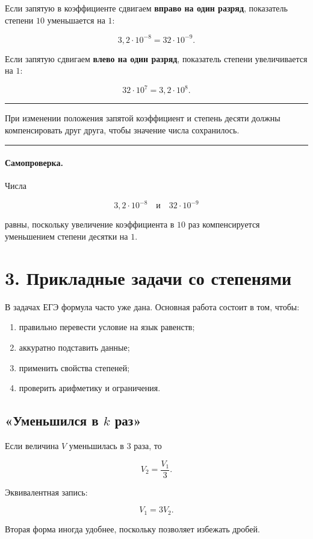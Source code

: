 \documentclass[a4paper,12pt]{article}
\newcommand{\important}[1]{\textbf{\color{darkaccent}#1}}
\newcommand{\keyidea}[1]{%
    \par\medskip
    {\color{accent}\rule{\linewidth}{0.6pt}}\par
    \smallskip
    #1
    \smallskip
    {\color{accent}\rule{\linewidth}{0.6pt}}\par
    \medskip
}
\begin{document}
Если запятую в коэффициенте сдвигаем \important{вправо на один разряд}, показатель степени \(10\) уменьшается на \(1\):

\[
3{,}2\cdot10^{-8}
=
32\cdot10^{-9}.
\]

Если запятую сдвигаем \important{влево на один разряд}, показатель степени увеличивается на \(1\):

\[
32\cdot10^7
=
3{,}2\cdot10^8.
\]

\keyidea{
При изменении положения запятой коэффициент и степень десяти должны компенсировать друг друга, чтобы значение числа сохранилось.
}

\paragraph{Самопроверка.}
Числа

\[
3{,}2\cdot10^{-8}
\quad\text{и}\quad
32\cdot10^{-9}
\]

равны, поскольку увеличение коэффициента в \(10\) раз компенсируется уменьшением степени десятки на \(1\).

\section{3. Прикладные задачи со степенями}

В задачах ЕГЭ формула часто уже дана. Основная работа состоит в том, чтобы:

\begin{enumerate}
    \item правильно перевести условие на язык равенств;
    \item аккуратно подставить данные;
    \item применить свойства степеней;
    \item проверить арифметику и ограничения.
\end{enumerate}

\subsection{«Уменьшился в \(k\) раз»}

Если величина \(V\) уменьшилась в \(3\) раза, то

\[
V_2=\frac{V_1}{3}.
\]

Эквивалентная запись:

\[
V_1=3V_2.
\]

Вторая форма иногда удобнее, поскольку позволяет избежать дробей.
\end{document}
